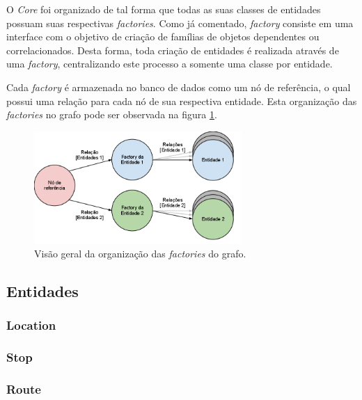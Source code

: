 O \emph{Core} foi organizado de tal forma que todas as suas classes de entidades possuam suas respectivas \emph{factories}.
Como já comentado, \emph{factory} consiste em uma interface com o objetivo de criação de famílias de objetos dependentes ou correlacionados.
Desta forma, toda criação de entidades é realizada através de uma \emph{factory}, centralizando este processo a somente uma classe por entidade.

Cada \emph{factory} é armazenada no banco de dados como um nó de referência, o qual possui uma relação para cada nó de sua respectiva entidade.
Esta organização das \emph{factories} no grafo pode ser observada na figura \ref{fig:grafoFactory}.

\begin{figure}[!htb]
	\centering
	\includegraphics[width=0.7\textwidth]{./grafoFactory.png}
	\caption[Arquitetura do sistema]{Visão geral da organização das \emph{factories} do grafo.}
	\label{fig:grafoFactory}
\end{figure}



\subsection{Entidades}

\subsubsection{Location}

\subsubsection{Stop}

\subsubsection{Route}

